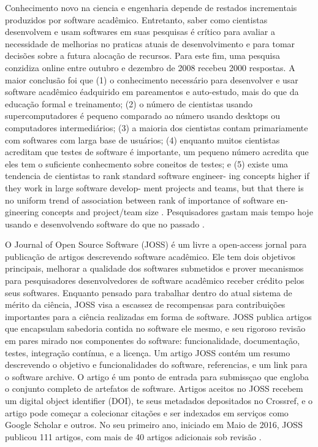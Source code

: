 Conhecimento novo na ciencia e engenharia depende de restados incrementais
produzidos por software acadêmico. Entretanto, saber como cientistas
desenvolvem e usam softwares em suas pesquisas é crítico para avaliar a
necessidade de melhorias no praticas atuais de desenvolvimento e para tomar
decisões sobre a futura alocação de recursos. Para este fim, uma pesquisa
conzidiza online entre outubro e dezembro de 2008 recebeu 2000 respostas.  A
maior conclusão foi que (1) o conhecimento necessário para desenvolver e usar
software acadêmico éadquirido em pareamentos e auto-estudo, mais do que da
educação formal e treinamento; (2) o número de cientistas usando
supercomputadores é pequeno comparado ao número usando desktops ou computadores
intermediários; (3) a maioria dos cientistas contam primariamente com softwares
com larga base de usuários; (4) enquanto muitos cientistas acreditam que testes
de software é importante, um pequeno número acredita que eles tem o suficiente
conhecmento sobre coneitos de testes; e (5) existe uma tendencia de cientistas
to rank standard software engineer- ing concepts higher if they work in large
software develop- ment projects and teams, but that there is no uniform trend
of association between rank of importance of software en- gineering concepts
and project/team size \cite{hannay2009scientists}.  Pesquisadores gastam mais
tempo hoje usando e desenvolvendo software do que no passado
\cite{hannay2009scientists}.

O Journal of Open Source Software (JOSS) é um livre a open-access jornal para
publicação de artigos descrevendo software acadêmico. Ele tem dois objetivos
principais, melhorar a qualidade dos softwares submetidos e prover mecanismos
para pesquisadores desenvolvedores de software acadêmico receber crédito pelos
seus softwares. Enquanto pensado para trabalhar dentro do atual sistema de
mérito da ciência, JOSS visa a escassez de recompensas para contribuições
importantes para a ciência realizadas em forma de software. JOSS publica
artigos que encapsulam sabedoria contida no software ele mesmo, e seu rigoroso
revisão em pares mirado nos componentes do software: funcionalidade,
documentação, testes, integração contínua, e a licença. Um artigo JOSS contém
um resumo descrevendo o objetivo e funcionalidades do software, referencias, e
um link para o software archive.  O artigo é um ponto de entrada para
submissçao que engloba o conjunto completo de artefatos de software. Artigos
aceitos no JOSS recebem um digital object identifier (DOI), te seus metadados
depositados no Crossref, e o artigo pode começar a colecionar citações e ser
indexados em serviços como Google Scholar e outros. No seu primeiro ano,
iniciado em Maio de 2016, JOSS publicou 111 artigos, com mais de 40 artigos
adicionais sob revisão \cite{smith2017journal}.


